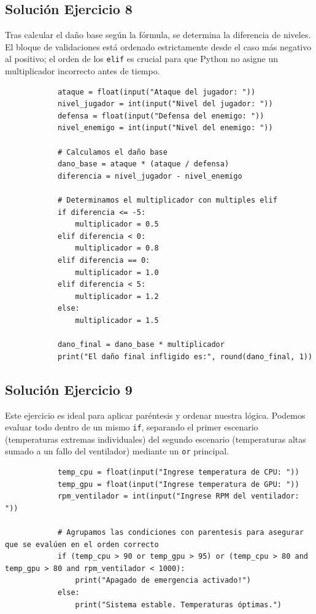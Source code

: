 \documentclass[11pt, a4paper]{article}
\begin{document}
	\subsection*{Solución Ejercicio 8}
	\begin{solucion}
		Tras calcular el daño base según la fórmula, se determina la diferencia de niveles. El bloque de validaciones está ordenado estrictamente desde el caso más negativo al positivo; el orden de los \texttt{elif} es crucial para que Python no asigne un multiplicador incorrecto antes de tiempo.
		
		\begin{lstlisting}
			ataque = float(input("Ataque del jugador: "))
			nivel_jugador = int(input("Nivel del jugador: "))
			defensa = float(input("Defensa del enemigo: "))
			nivel_enemigo = int(input("Nivel del enemigo: "))
			
			# Calculamos el daño base
			dano_base = ataque * (ataque / defensa)
			diferencia = nivel_jugador - nivel_enemigo
			
			# Determinamos el multiplicador con multiples elif
			if diferencia <= -5:
				multiplicador = 0.5
			elif diferencia < 0:
				multiplicador = 0.8
			elif diferencia == 0:
				multiplicador = 1.0
			elif diferencia < 5:
				multiplicador = 1.2
			else:
				multiplicador = 1.5
			
			dano_final = dano_base * multiplicador
			print("El daño final infligido es:", round(dano_final, 1))
		\end{lstlisting}
	\end{solucion}
	
	\subsection*{Solución Ejercicio 9}
	\begin{solucion}
		Este ejercicio es ideal para aplicar paréntesis y ordenar nuestra lógica. Podemos evaluar todo dentro de un mismo \texttt{if}, separando el primer escenario (temperaturas extremas individuales) del segundo escenario (temperaturas altas sumado a un fallo del ventilador) mediante un \texttt{or} principal.
		
		\begin{lstlisting}
			temp_cpu = float(input("Ingrese temperatura de CPU: "))
			temp_gpu = float(input("Ingrese temperatura de GPU: "))
			rpm_ventilador = int(input("Ingrese RPM del ventilador: "))
			
			# Agrupamos las condiciones con parentesis para asegurar que se evalúen en el orden correcto
			if (temp_cpu > 90 or temp_gpu > 95) or (temp_cpu > 80 and temp_gpu > 80 and rpm_ventilador < 1000):
				print("Apagado de emergencia activado!")
			else:
				print("Sistema estable. Temperaturas óptimas.")
		\end{lstlisting}
	\end{solucion}
	
\end{document}
